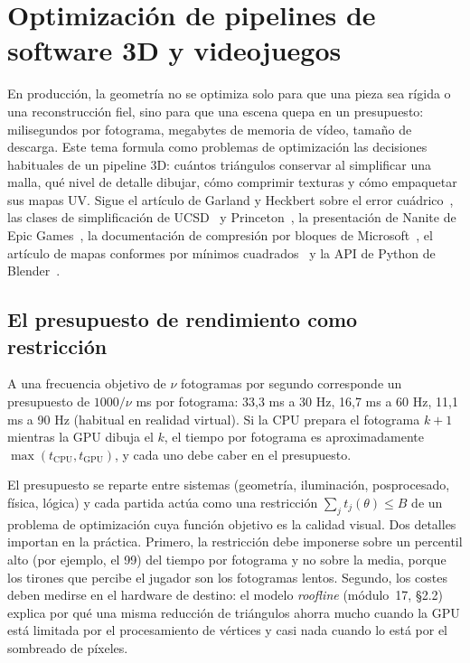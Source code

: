 \chapter{Optimización de pipelines de software 3D y videojuegos}
\label{tema:5}

En producción, la geometría no se optimiza solo para que una pieza sea rígida o una reconstrucción fiel, sino para que una escena quepa en un presupuesto: milisegundos por fotograma, megabytes de memoria de vídeo, tamaño de descarga. Este tema formula como problemas de optimización las decisiones habituales de un pipeline 3D: cuántos triángulos conservar al simplificar una malla, qué nivel de detalle dibujar, cómo comprimir texturas y cómo empaquetar sus mapas UV. Sigue el artículo de Garland y Heckbert sobre el error cuádrico~\cite{garland}, las clases de simplificación de UCSD~\cite{ucsd190} y Princeton~\cite{cos526}, la presentación de Nanite de Epic Games~\cite{nanite}, la documentación de compresión por bloques de Microsoft~\cite{msbc}, el artículo de mapas conformes por mínimos cuadrados~\cite{lscm} y la API de Python de Blender~\cite{blenderapi}.

\section{El presupuesto de rendimiento como restricción}

\begin{definicion}\label{def:presupuesto}
A una frecuencia objetivo de $\nu$ fotogramas por segundo corresponde un presupuesto de $1000/\nu$ ms por fotograma: 33,3 ms a 30 Hz, 16,7 ms a 60 Hz, 11,1 ms a 90 Hz (habitual en realidad virtual). Si la CPU prepara el fotograma $k+1$ mientras la GPU dibuja el $k$, el tiempo por fotograma es aproximadamente $\max(t_{\text{CPU}},t_{\text{GPU}})$, y cada uno debe caber en el presupuesto.
\end{definicion}

El presupuesto se reparte entre sistemas (geometría, iluminación, posprocesado, física, lógica) y cada partida actúa como una restricción $\sum_jt_j(\theta)\le B$ de un problema de optimización cuya función objetivo es la calidad visual. Dos detalles importan en la práctica. Primero, la restricción debe imponerse sobre un percentil alto (por ejemplo, el 99) del tiempo por fotograma y no sobre la media, porque los tirones que percibe el jugador son los fotogramas lentos. Segundo, los costes deben medirse en el hardware de destino: el modelo \emph{roofline} (módulo~17, §2.2) explica por qué una misma reducción de triángulos ahorra mucho cuando la GPU está limitada por el procesamiento de vértices y casi nada cuando lo está por el sombreado de píxeles.

